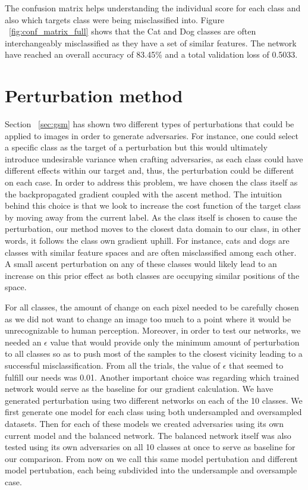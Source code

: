 The confusion matrix helps understanding the individual score for each class and also which targets class were being misclassified into. Figure ~\ref{fig:conf_matrix_full} shows that the Cat and Dog classes are often interchangeably misclassified as they have a set of similar features. The network have reached an overall accuracy of 83.45\% and a total validation loss of 0.5033.

\section{Perturbation method}
Section ~\ref{sec:gsm} has shown two different types of perturbations that could be applied to images in order to generate adversaries. For instance, one could select a specific class as the target of a perturbation but this would ultimately introduce undesirable variance when crafting adversaries, as each class could have different effects within our target and, thus, the perturbation could be different on each case. In order to address this problem, we have chosen the class itself as the backpropagated gradient coupled with the ascent method. The intuition behind this choice is that we look to increase the cost function of the target class by moving away from the current label. As the class itself is chosen to cause the perturbation, our method moves to the closest data domain to our class, in other words, it follows the class own gradient uphill. For instance, cats and dogs are classes with similar feature spaces and are often misclassified among each other. A small ascent perturbation on any of these classes would likely lead to an increase on this prior effect as both classes are occupying similar positions of the space. 

For all classes, the amount of change on each pixel needed to be carefully chosen as we did not want to change an image too much to a point where it would be unrecognizable to human perception. Moreover, in order to test our networks, we needed an $\epsilon$ value that would provide only the minimum amount of perturbation to all classes so as to push most of the samples to the closest vicinity leading to a successful misclassification. From all the trials, the value of $\epsilon$ that seemed to fulfill our needs was 0.01. Another important choice was regarding which trained network would serve as the baseline for our gradient calculation. We have generated perturbation using two different networks on each of the 10 classes. We first generate one model for each class using both undersampled and oversampled datasets. Then for each of these models we created adversaries using its own current model and the balanced network. The balanced network itself was also tested using its own adversaries on all 10 classes at once to serve as baseline for our comparison. From now on we call this same model pertubation and different model pertubation, each being subdivided into the undersample and oversample case.

